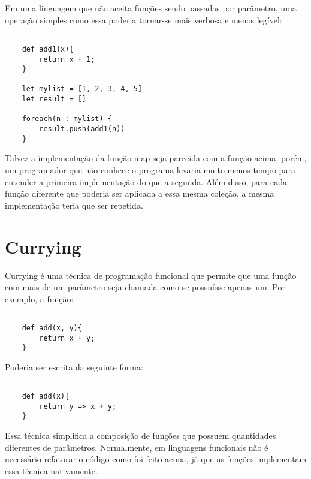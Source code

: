 Em uma linguagem que não aceita funções sendo 
passadas por parâmetro, uma operação simples como 
essa poderia tornar-se mais verbosa e menos legível:

\begin{lstlisting}[caption={Exemplo sem Funções de Alta Ordem},label=nohof]

    def add1(x){
        return x + 1;
    }

    let mylist = [1, 2, 3, 4, 5]
    let result = []

    foreach(n : mylist) {
        result.push(add1(n))
    }

\end{lstlisting}

Talvez a implementação da função map seja parecida 
com a função acima, porém, um programador que não 
conhece o programa levaria muito menos tempo para 
entender a primeira implementação do que a segunda. 
Além disso, para cada função diferente que poderia 
ser aplicada a essa mesma coleção, a mesma 
implementação teria que ser repetida.




\section{Currying}

Currying é uma técnica de programação funcional que 
permite que uma função com mais de um parâmetro seja 
chamada como se possuísse apenas um\cite{realworldhaskell, functionalscala}. 
Por exemplo, a função:

\begin{lstlisting}[caption={Exemplo sem Currying},label=nocurrex]

    def add(x, y){
        return x + y;
    }

\end{lstlisting}

Poderia ser escrita da seguinte forma:

\begin{lstlisting}[caption={Exemplo de Currying},label=currex]

    def add(x){
        return y => x + y;
    }

\end{lstlisting}

Essa técnica simplifica a composição de funções 
que possuem quantidades diferentes de parâmetros. 
Normalmente, em linguagens funcionais não é 
necessário refatorar o código como foi feito 
acima, já que as funções implementam essa técnica 
nativamente\cite{realworldhaskell}.



